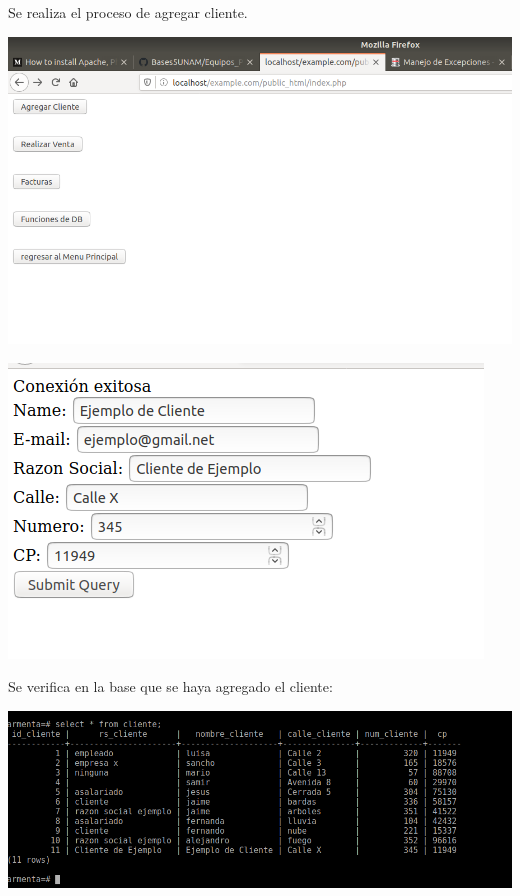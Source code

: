 \documentclass[12pt, letterpaper]{article}     %
\begin{document}
		Se realiza el proceso de agregar cliente.
				
		
		\begin{center}
 	  	\includegraphics[scale=0.5]{web_menu}
		\end{center}
		
		\begin{center}
 	  	\includegraphics[scale=0.5]{web_cliente_datos}
		\end{center}
		
		Se verifica en la base que se haya agregado el cliente:
		
		\begin{center}
 	  	\includegraphics[scale=0.5]{web_cliente_after}
		\end{center}
		
\end{document}
